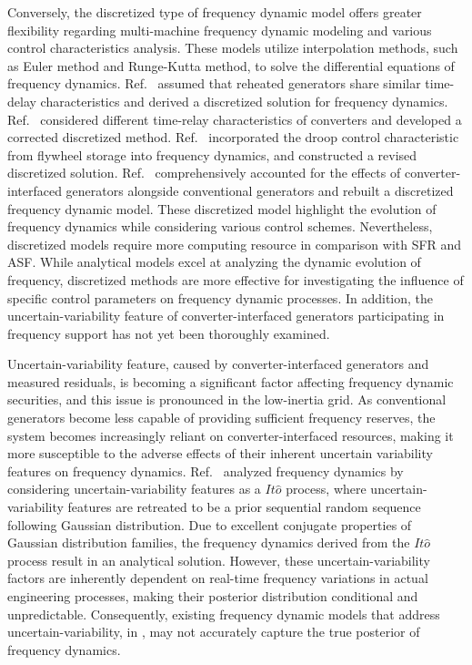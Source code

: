 \documentclass[lettersize,journal]{IEEEtran}
\begin{document}
Conversely, the discretized type of frequency dynamic model offers greater flexibility regarding multi-machine frequency dynamic modeling and various control characteristics analysis. These models utilize interpolation methods, such as Euler method and Runge-Kutta method, to solve the differential equations of frequency dynamics. Ref.~\cite{10219063} assumed that reheated generators share similar time-delay characteristics and derived a discretized solution for frequency dynamics. Ref.~\cite{vatani2015relay} considered different time-relay characteristics of converters and developed a corrected discretized method. Ref.~\cite{oskouee2021primary,mahmoudnia2024enhancing} incorporated the droop control characteristic from flywheel storage into frequency dynamics, and constructed a revised discretized solution. Ref.~\cite{ye2015analytical} comprehensively accounted for the effects of converter-interfaced generators alongside conventional generators and rebuilt a discretized frequency dynamic model. These discretized model highlight the evolution of frequency dynamics while considering various control schemes. Nevertheless, discretized models require more computing resource in comparison with SFR and ASF. While analytical models excel at analyzing the dynamic evolution of frequency, discretized methods are more effective for investigating the influence of specific control parameters on frequency dynamic processes. In addition, the uncertain-variability feature of converter-interfaced generators participating in frequency support has not yet been thoroughly examined.

Uncertain-variability feature, caused by converter-interfaced generators and measured residuals, is becoming a significant factor affecting frequency dynamic securities, and this issue is pronounced in the low-inertia grid. As conventional generators become less capable of providing sufficient frequency reserves, the system becomes increasingly reliant on converter-interfaced resources, making it more susceptible to the adverse effects of their inherent uncertain variability features on frequency dynamics. Ref.~\cite{8478399,8122022} analyzed frequency dynamics by considering uncertain-variability features as a \(\textit{It}\widehat{o}\) process, where uncertain-variability features are retreated to be a prior sequential random sequence following Gaussian distribution. Due to excellent conjugate properties of Gaussian distribution families, the frequency dynamics derived from the \(\textit{It}\widehat{o}\) process result in an analytical solution. However, these uncertain-variability factors are inherently dependent on real-time frequency variations in actual engineering processes, making their posterior distribution conditional and unpredictable. Consequently, existing frequency dynamic models that address uncertain-variability, in \cite{8478399,8122022}, may not accurately capture the true posterior of frequency dynamics.
\end{document}
